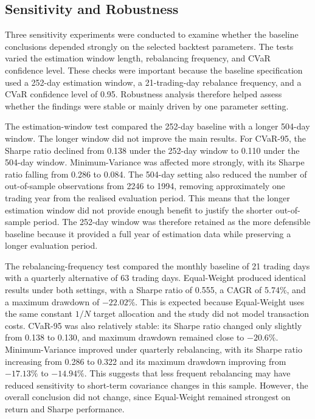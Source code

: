 \subsection{Sensitivity and Robustness}
\par Three sensitivity experiments were conducted to examine whether the baseline conclusions depended strongly on the selected backtest parameters. The tests varied the estimation window length, rebalancing frequency, and CVaR confidence level. These checks were important because the baseline specification used a 252-day estimation window, a 21-trading-day rebalance frequency, and a CVaR confidence level of 0.95. Robustness analysis therefore helped assess whether the findings were stable or mainly driven by one parameter setting.
\par The estimation-window test compared the 252-day baseline with a longer 504-day window. The longer window did not improve the main results. For CVaR-95, the Sharpe ratio declined from 0.138 under the 252-day window to 0.110 under the 504-day window. Minimum-Variance was affected more strongly, with its Sharpe ratio falling from 0.286 to 0.084. The 504-day setting also reduced the number of out-of-sample observations from 2246 to 1994, removing approximately one trading year from the realised evaluation period. This means that the longer estimation window did not provide enough benefit to justify the shorter out-of-sample period. The 252-day window was therefore retained as the more defensible baseline because it provided a full year of estimation data while preserving a longer evaluation period.
\par The rebalancing-frequency test compared the monthly baseline of 21 trading days with a quarterly alternative of 63 trading days. Equal-Weight produced identical results under both settings, with a Sharpe ratio of 0.555, a CAGR of 5.74\%, and a maximum drawdown of $-22.02\%$. This is expected because Equal-Weight uses the same constant $1/N$ target allocation and the study did not model transaction costs. CVaR-95 was also relatively stable: its Sharpe ratio changed only slightly from 0.138 to 0.130, and maximum drawdown remained close to $-20.6\%$. Minimum-Variance improved under quarterly rebalancing, with its Sharpe ratio increasing from 0.286 to 0.322 and its maximum drawdown improving from $-17.13\%$ to $-14.94\%$. This suggests that less frequent rebalancing may have reduced sensitivity to short-term covariance changes in this sample. However, the overall conclusion did not change, since Equal-Weight remained strongest on return and Sharpe performance.

